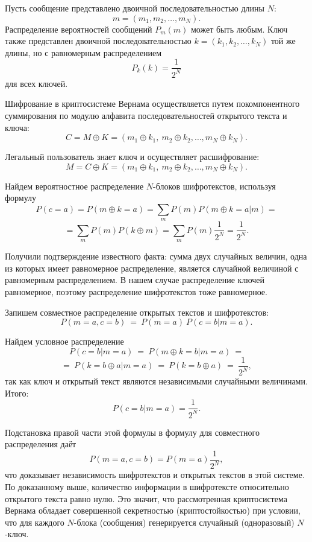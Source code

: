 Пусть сообщение представлено двоичной последовательностью длины $N$:
    \[ m = (m_1, m_2, \dots, m_N). \]
Распределение вероятностей сообщений $P_m(m)$ может быть любым. Ключ также представлен двоичной последовательностью $ k = (k_1, k_2, \dots, k_N)$ той же длины, но с равномерным распределением
    \[ P_k(k) = \frac{1}{2^N} \]
для всех ключей.

Шифрование в криптосистеме Вернама осуществляется путем покомпонентного суммирования по модулю алфавита последовательностей открытого текста и ключа:
    \[ C = M \oplus K = (m_1 \oplus k_1, ~ m_2 \oplus k_2, \dots,  m_N \oplus k_N). \]

Легальный пользователь знает ключ и осуществляет расшифрование:
    \[ M =C \oplus K = (m_1 \oplus k_1, ~ m_2 \oplus k_2, \dots, m_N \oplus k_N). \]

Найдем вероятностное распределение $N$-блоков шифротекстов, используя формулу
    \[ P(c = a) = P(m \oplus k = a) = \sum_{m} P(m) P(m \oplus k = a | m) = \]
    \[ = \sum_{m} P(m) P(k \oplus m) = \sum_{m} P(m) \frac{1}{2^N} = \frac{1}{2^N}. \]

Получили подтверждение известного факта: сумма двух случайных величин, одна из которых имеет равномерное распределение, является случайной величиной с равномерным распределением. В нашем случае распределение ключей равномерное, поэтому распределение шифротекстов тоже равномерное.

Запишем совместное распределение открытых текстов и шифротекстов:
    \[ P(m = a, c = b) ~=~ P(m = a) ~ P(c = b | m = a). \]

Найдем условное распределение
    \[ P(c = b | m = a) ~=~ P(m \oplus k = b | m = a) ~= \]
    \[ =~ P(k = b \oplus a | m = a) ~=~ P(k = b \oplus a) ~=~ \frac{1}{2^N}, \]
так как ключ и открытый текст являются независимыми случайными величинами. Итого:
    \[ P(c=b | m=a) = \frac{1}{2^N}. \]

Подстановка правой части этой формулы в формулу для совместного распределения даёт
    \[ P(m=a,c=b)=P(m=a)\frac{1}{2^N}, \]
что доказывает независимость шифротекстов и открытых текстов в этой системе. По доказанному выше, количество информации в шифротексте относительно открытого текста равно нулю. Это значит, что рассмотренная криптосистема Вернама обладает совершенной секретностью (криптостойкостью) при условии, что для каждого $N$-блока (сообщения) генерируется случайный (одноразовый) $N$-ключ.



